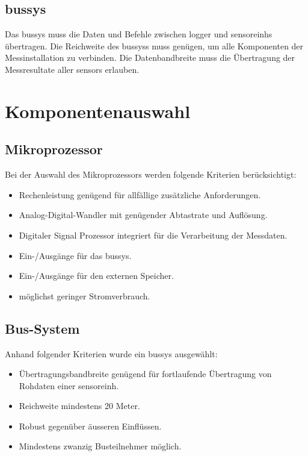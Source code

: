 \subsection{\gls{bussys}}
Das \gls{bussys} muss die Daten und Befehle zwischen \gls{logger} und \glspl{sensoreinh} übertragen. Die Reichweite des \gls{bussys}s muss genügen, um alle Komponenten der Messinstallation zu verbinden. Die Datenbandbreite muss die Übertragung der Messresultate aller \glspl{sensor} erlauben.


\section{Komponentenauswahl}

\subsection{Mikroprozessor}
Bei der Auswahl des Mikroprozessors werden folgende Kriterien berücksichtigt:

\begin{itemize}
\item Rechenleistung genügend für allfällige zusätzliche Anforderungen.
\item Analog-Digital-Wandler mit genügender Abtastrate und Auflösung.
\item Digitaler Signal Prozessor integriert für die Verarbeitung der Messdaten.
\item Ein-/Ausgänge für das \gls{bussys}.
\item Ein-/Ausgänge für den externen Speicher.
\item möglichst geringer Stromverbrauch.
\end{itemize}



\subsection{Bus-System}
Anhand folgender Kriterien wurde ein \gls{bussys} ausgewählt:

\begin{itemize}
\item Übertragungsbandbreite genügend für fortlaufende Übertragung von Rohdaten einer \gls{sensoreinh}.
\item Reichweite mindestens 20 Meter.
\item Robust gegenüber äusseren Einflüssen.
\item Mindestens zwanzig Busteilnehmer möglich.
\end{itemize}

